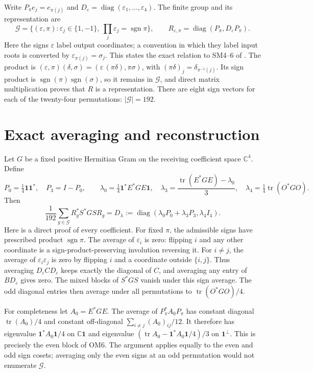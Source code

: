 \documentclass[11pt]{article}
\newcommand{\C}{\mathbb C}
\newcommand{\tr}{\operatorname{tr}}
\newcommand{\diag}{\operatorname{diag}}
\newcommand{\sgn}{\operatorname{sgn}}
\newcommand{\eps}{\varepsilon}
\newcommand{\one}{\mathbf 1}
\begin{document}
Write $P_\pi e_j=e_{\pi(j)}$ and $D_\eps=\diag(\eps_1,\ldots,\eps_4)$.
The finite group and its representation are
\[
\mathcal G=\{(\eps,\pi):\eps_j\in\{1,-1\},
       \ \prod_j\eps_j=\sgn\pi\},\qquad
R_{\eps,\pi}=\diag(P_\pi,D_\eps P_\pi).
\tag{OM4}
\]
Here the signs $\eps$ label output coordinates; a convention in which
they label input roots is converted by $\eps_{\pi(j)}=\sigma_j$.
This states the exact relation to SM4--6 of \cite{Fable}.
The product is
$(\eps,\pi)(\delta,\sigma)=(\eps\,(\pi\delta),\pi\sigma)$, with
$(\pi\delta)_j=\delta_{\pi^{-1}(j)}$.  Its sign product is
$\sgn(\pi)\sgn(\sigma)$, so it remains in $\mathcal G$, and direct
matrix multiplication proves that $R$ is a representation.  There
are eight sign vectors for each of the twenty-four permutations:
$|\mathcal G|=192$.

\section{Exact averaging and reconstruction}
Let $G$ be a fixed positive Hermitian Gram on the receiving coefficient
space $\C^4$.  Define
\[
P_0=\tfrac14\one\one^*,\quad P_3=I-P_0,\qquad
\lambda_0=\tfrac14\one^*E^*GE\one,\quad
\lambda_3=\frac{\tr(E^*GE)-\lambda_0}{3},\quad
\lambda_4=\tfrac14\tr(O^*GO).
\tag{OM5}
\]
Then
\[
\frac1{192}\sum_{g\in\mathcal G}R_g^*S^*GS R_g
=D_\lambda:=
\diag(\lambda_0P_0+\lambda_3P_3,\lambda_4I_4).
\tag{OM6}
\]
Here is a direct proof of every coefficient.  For fixed $\pi$, the
admissible signs have prescribed product $\sgn\pi$.  The average of
$\eps_i$ is zero: flipping $i$ and any other coordinate is a
sign-product-preserving involution reversing it.  For $i\ne j$,
the average of $\eps_i\eps_j$ is zero by flipping $i$ and a coordinate
outside $\{i,j\}$.  Thus averaging $D_\eps C D_\eps$ keeps exactly
the diagonal of $C$, and averaging any entry of $B D_\eps$ gives
zero.  The mixed blocks of $S^*GS$ vanish under this sign average.
The odd diagonal entries then average under all permutations to
$\tr(O^*GO)/4$.

For completeness let $A_0=E^*GE$.  The average of $P_\pi^*A_0P_\pi$
has constant diagonal $\tr(A_0)/4$ and constant off-diagonal
$\sum_{i\ne j}(A_0)_{ij}/12$.  It therefore has eigenvalue
$\one^*A_0\one/4$ on $\C\one$ and eigenvalue
$(\tr A_0-\one^*A_0\one/4)/3$ on $\one^\perp$.
This is precisely the even block of OM6.  The argument applies
equally to the even and odd sign cosets; averaging only the
even signs at an odd permutation would not enumerate $\mathcal G$.
\end{document}
